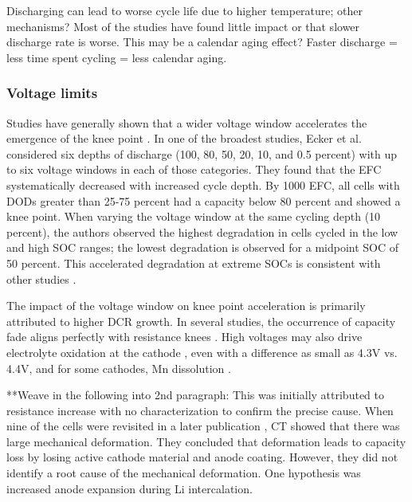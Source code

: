 \documentclass{article}
\begin{document}
Discharging can lead to worse cycle life due to higher temperature; other mechanisms? Most of the studies have found little impact or that slower discharge rate is worse. This may be a calendar aging effect? Faster discharge = less time spent cycling = less calendar aging. 

\subsubsection{Voltage limits} 
Studies have generally shown that a wider voltage window accelerates the emergence of the knee point \cite{ecker_calendar_2014, pfrang_long-term_2018, klett_non-uniform_2014, ma_novel_2019, petzl_lithium_2015, schuster_nonlinear_2015}. In one of the broadest studies, Ecker et al. \cite{ecker_calendar_2014} considered six depths of discharge (100, 80, 50, 20, 10, and 0.5 percent) with up to six voltage windows in each of those categories. They found that the EFC systematically decreased with increased cycle depth. By 1000 EFC, all cells with DODs greater than 25-75 percent had a capacity below 80 percent and showed a knee point. When varying the voltage window at the same cycling depth (10 percent), the authors observed the highest degradation in cells cycled in the low and high SOC ranges; the lowest degradation is observed for a midpoint SOC of 50 percent. This accelerated degradation at extreme SOCs is consistent with other studies \cite{aiken_accelerated_2020,ma_novel_2019, zhu_investigation_2021}.

The impact of the voltage window on knee point acceleration is primarily attributed to higher DCR growth. In several studies, the occurrence of capacity fade aligns perfectly with resistance knees \cite{ecker_calendar_2014, klett_non-uniform_2014, schuster_nonlinear_2015, zhu_investigation_2021}. High voltages may also drive electrolyte oxidation at the cathode \cite{aiken_accelerated_2020}, even with a difference as small as 4.3V vs. 4.4V, and for some cathodes, Mn dissolution \cite{ma_novel_2019}. 

 **Weave in the following into 2nd paragraph: This was initially attributed to resistance increase with no characterization to confirm the precise cause. When nine of the cells were revisited in a later publication \cite{pfrang_long-term_2018}, CT showed that there was large mechanical deformation.  They concluded that deformation leads to capacity loss by losing active cathode material and anode coating. However, they did not identify a root cause of the mechanical deformation. One hypothesis was increased anode expansion during Li intercalation. 
\end{document}
